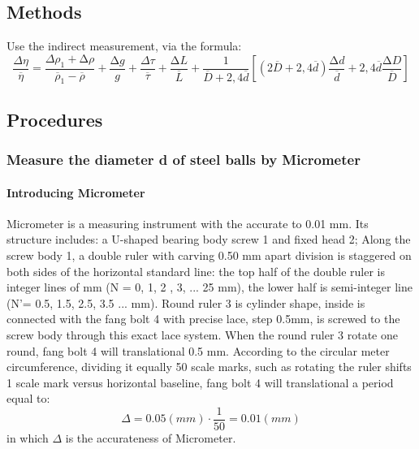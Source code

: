 
\subsection{Methods}
Use the indirect measurement, via the formula:
\[\frac{\Delta \eta }{\overline{\eta }}=\frac{{\Delta \rho }_1+\mathrm{\Delta }\rho }{{\overline{\rho }}_1-\overline{\rho }}+\frac{\mathrm{\Delta }g}{g}+\frac{\mathit{\Delta}\tau }{\overline{\tau }}+\frac{\mathrm{\Delta }L}{\overline{L}}+\frac{1}{\overline{D}+2,4\overline{d}}\left[\left(2\overline{D}+2,4\overline{d}\right)\frac{\mathrm{\Delta }d}{\overline{d}}+2,4\overline{d}\frac{\mathrm{\Delta }D}{\overline{D}}\right]\] 

\subsection{Procedures}
\subsubsection{Measure the diameter d of steel balls by Micrometer}
\paragraph{Introducing Micrometer}
Micrometer is a measuring instrument with the accurate to 0.01 mm. Its structure includes: a U-shaped bearing body screw 1 and fixed head 2; Along the screw body 1, a double ruler with carving 0.50 mm apart division is staggered on both sides of the horizontal standard line: the top half of the double ruler is integer lines of mm (N = 0, 1, 2 , 3, ... 25 mm), the lower half is semi-integer line (N'= 0.5, 1.5, 2.5, 3.5 ... mm). Round ruler 3 is cylinder shape, inside is connected with the fang bolt 4 with precise lace, step 0.5mm, is screwed to the screw body through this exact lace system. When the round ruler 3 rotate one round, fang bolt 4 will translational 0.5 mm. According to the circular meter circumference, dividing it equally 50 scale marks, such as rotating the ruler shifts 1 scale mark versus horizontal baseline, fang bolt 4 will translational a period equal to:
\[\Delta = 0.05(mm) \cdot \frac{1}{50} = 0.01 (mm)\]
in which $\Delta$ is the accurateness of Micrometer.
    
